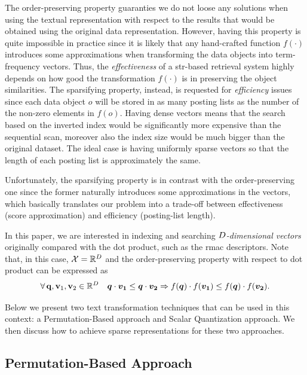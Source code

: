 The order-preserving property guaranties we do not loose any solutions when using the textual representation with respect to the results that would be obtained using the original data representation.
However, having this property is quite impossible in practice since it is likely that any hand-crafted function $f(\cdot)$ introduces some approximations when transforming the data objects into term-frequency vectors.
Thus, the \emph{effectiveness} of a \gls{str}-based retrieval system highly depends on how good the transformation $f(\cdot)$ is in preserving the object similarities.
The sparsifying property, instead, is requested for \emph{efficiency} issues since each data object $o$ will be stored in as many posting lists as the number of the non-zero elements in $f(o)$.
Having dense vectors means that the search based on the inverted index would be significantly more expensive than the sequential scan, moreover also the index size would be much bigger than the original dataset.
The ideal case is having uniformly sparse vectors so that the length of each posting list is approximately the same.

Unfortunately, the sparsifying property is in contrast with the order-preserving one since the former naturally introduces some approximations in the vectors, which basically translates our problem into a trade-off between effectiveness (score approximation) and efficiency (posting-list length).

In this paper, we are interested in indexing and searching \emph{${D}$-dimensional vectors} originally compared with the dot product, such as the \gls{rmac} descriptors. Note that, in this case, $\mathcal{X}=\mathbb{R}^{{D}}$ and the order-preserving property with respect to dot product can be expressed as
\begin{equation}
\forall\, \mathbf{q},\mathbf{v}_1,\mathbf{v}_2 \in \mathbb{R}^{{D}} \quad	\boldsymbol {q}\cdot \boldsymbol {v_1} \leq \boldsymbol {q}\cdot \boldsymbol { v_2} \Rightarrow f(\boldsymbol {q})\cdot f(\boldsymbol {v_1}) \leq f(\boldsymbol {q})\cdot f(\boldsymbol {v_2}).
\end{equation}

Below we present two text transformation techniques that can be used in this context: a Permutation-Based approach and Scalar Quantization approach.
We then discuss how to achieve sparse representations for these two approaches.

\subsection{Permutation-Based Approach}
\label{subsec:str:deep-permutations}

